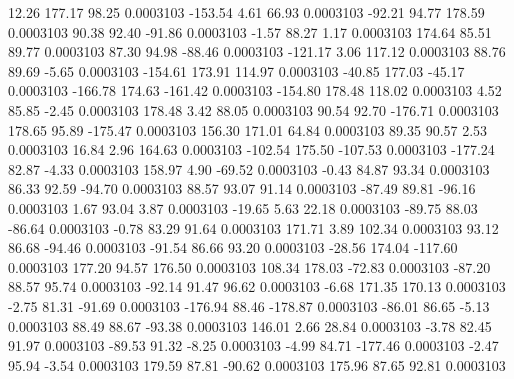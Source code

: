        12.26      177.17       98.25     0.0003103
     -153.54        4.61       66.93     0.0003103
      -92.21       94.77      178.59     0.0003103
       90.38       92.40      -91.86     0.0003103
       -1.57       88.27        1.17     0.0003103
      174.64       85.51       89.77     0.0003103
       87.30       94.98      -88.46     0.0003103
     -121.17        3.06      117.12     0.0003103
       88.76       89.69       -5.65     0.0003103
     -154.61      173.91      114.97     0.0003103
      -40.85      177.03      -45.17     0.0003103
     -166.78      174.63     -161.42     0.0003103
     -154.80      178.48      118.02     0.0003103
        4.52       85.85       -2.45     0.0003103
      178.48        3.42       88.05     0.0003103
       90.54       92.70     -176.71     0.0003103
      178.65       95.89     -175.47     0.0003103
      156.30      171.01       64.84     0.0003103
       89.35       90.57        2.53     0.0003103
       16.84        2.96      164.63     0.0003103
     -102.54      175.50     -107.53     0.0003103
     -177.24       82.87       -4.33     0.0003103
      158.97        4.90      -69.52     0.0003103
       -0.43       84.87       93.34     0.0003103
       86.33       92.59      -94.70     0.0003103
       88.57       93.07       91.14     0.0003103
      -87.49       89.81      -96.16     0.0003103
        1.67       93.04        3.87     0.0003103
      -19.65        5.63       22.18     0.0003103
      -89.75       88.03      -86.64     0.0003103
       -0.78       83.29       91.64     0.0003103
      171.71        3.89      102.34     0.0003103
       93.12       86.68      -94.46     0.0003103
      -91.54       86.66       93.20     0.0003103
      -28.56      174.04     -117.60     0.0003103
      177.20       94.57      176.50     0.0003103
      108.34      178.03      -72.83     0.0003103
      -87.20       88.57       95.74     0.0003103
      -92.14       91.47       96.62     0.0003103
       -6.68      171.35      170.13     0.0003103
       -2.75       81.31      -91.69     0.0003103
     -176.94       88.46     -178.87     0.0003103
      -86.01       86.65       -5.13     0.0003103
       88.49       88.67      -93.38     0.0003103
      146.01        2.66       28.84     0.0003103
       -3.78       82.45       91.97     0.0003103
      -89.53       91.32       -8.25     0.0003103
       -4.99       84.71     -177.46     0.0003103
       -2.47       95.94       -3.54     0.0003103
      179.59       87.81      -90.62     0.0003103
      175.96       87.65       92.81     0.0003103
